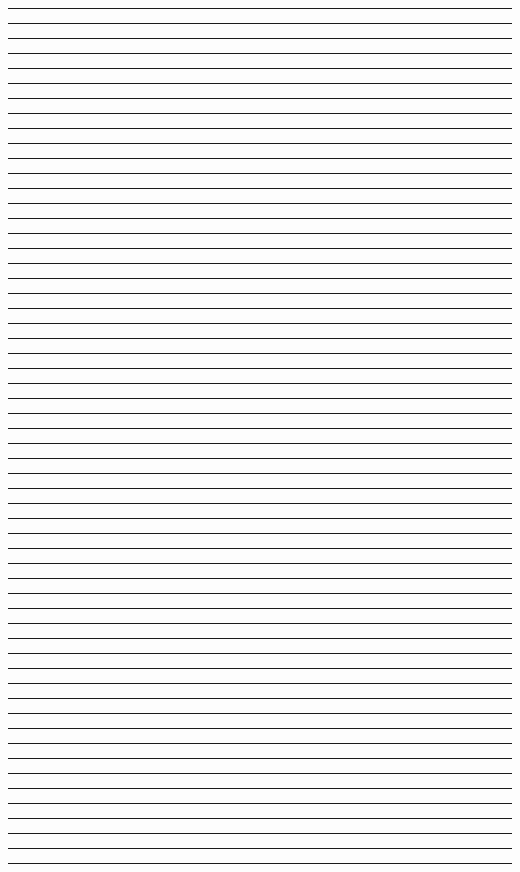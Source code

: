 \documentclass[a4paper,14pt]{article}
\begin{document}
\noindent
\rule{18cm}{0.5pt}
\rule{18cm}{0.5pt}
\rule{18cm}{0.5pt}
\rule{18cm}{0.5pt}
\rule{18cm}{0.5pt}
\rule{18cm}{0.5pt}
\rule{18cm}{0.5pt}
\rule{18cm}{0.5pt}
\rule{18cm}{0.5pt}
\rule{18cm}{0.5pt}
\rule{18cm}{0.5pt}
\rule{18cm}{0.5pt}
\rule{18cm}{0.5pt}
\rule{18cm}{0.5pt}
\rule{18cm}{0.5pt}
\rule{18cm}{0.5pt}
\rule{18cm}{0.5pt}
\rule{18cm}{0.5pt}
\rule{18cm}{0.5pt}
\rule{18cm}{0.5pt}
\rule{18cm}{0.5pt}
\rule{18cm}{0.5pt}
\rule{18cm}{0.5pt}
\rule{18cm}{0.5pt}
\rule{18cm}{0.5pt}
\rule{18cm}{0.5pt}
\rule{18cm}{0.5pt}
\rule{18cm}{0.5pt}
\rule{18cm}{0.5pt}
\rule{18cm}{0.5pt}
\rule{18cm}{0.5pt}
\rule{18cm}{0.5pt}
\rule{18cm}{0.5pt}
\rule{18cm}{0.5pt}
\rule{18cm}{0.5pt}
\rule{18cm}{0.5pt}
\rule{18cm}{0.5pt}
\rule{18cm}{0.5pt}
\rule{18cm}{0.5pt}
\rule{18cm}{0.5pt}
\rule{18cm}{0.5pt}
\rule{18cm}{0.5pt}
\rule{18cm}{0.5pt}
\rule{18cm}{0.5pt}
\rule{18cm}{0.5pt}
\rule{18cm}{0.5pt}
\rule{18cm}{0.5pt}
\rule{18cm}{0.5pt}
\rule{18cm}{0.5pt}
\rule{18cm}{0.5pt}
\rule{18cm}{0.5pt}
\rule{18cm}{0.5pt}
\rule{18cm}{0.5pt}
\rule{18cm}{0.5pt}
\rule{18cm}{0.5pt}
\rule{18cm}{0.5pt}
\rule{18cm}{0.5pt}
\rule{18cm}{0.5pt}
\end{document}
